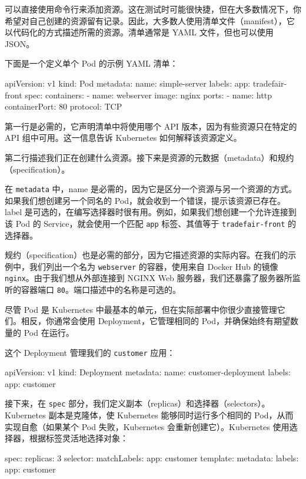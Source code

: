 \label{idx:1974}
可以直接使用命令行来添加资源。这在测试时可能很快捷，但在大多数情况下，你希望对自己创建的资源留有记录。因此，大多数人使用清单文件（manifest），它以代码化的方式描述所需的资源。清单通常是 YAML 文件，但也可以使用 JSON。

下面是一个定义单个 Pod 的示例 YAML 清单：

\begin{codebox}[yaml]
apiVersion: v1
kind: Pod
metadata:
  name: simple-server
  labels:
    app: tradefair-front
spec:
  containers:
    - name: webserver
      image: nginx
      ports:
        - name: http
          containerPort: 80
          protocol: TCP
\end{codebox}

第一行是必需的，它声明清单中将使用哪个 API 版本，因为有些资源只在特定的 API 组中可用。这一信息告诉 Kubernetes 如何解释该资源定义。

第二行描述我们正在创建什么资源。接下来是资源的元数据（metadata）和规约（specification）。

在 \texttt{metadata} 中，name 是必需的，因为它是区分一个资源与另一个资源的方式。如果我们想创建另一个同名的 Pod，就会收到一个错误，提示该资源已存在。label 是可选的，在编写选择器时很有用。例如，如果我们想创建一个允许连接到该 Pod 的 Service，就会使用一个匹配 \texttt{app} 标签、其值等于 \texttt{tradefair-front} 的选择器。

\label{idx:1975}
规约（specification）也是必需的部分，因为它描述资源的实际内容。在我们的示例中，我们列出一个名为 \texttt{webserver} 的容器，使用来自 Docker Hub 的镜像 \texttt{nginx}。由于我们想从外部连接到 NGINX Web 服务器，我们还暴露了服务器所监听的容器端口 \texttt{80}。端口描述中的名称是可选的。

尽管 Pod 是 Kubernetes 中最基本的单元，但在实际部署中你很少直接管理它们。相反，你通常会使用 Deployment，它管理相同的 Pod，并确保始终有期望数量的 Pod 在运行。

这个 Deployment 管理我们的 \texttt{customer} 应用：

\begin{codebox}[yaml]
apiVersion: v1
kind: Deployment
metadata:
  name: customer-deployment
  labels:
    app: customer
\end{codebox}

接下来，在 \texttt{spec} 部分，我们定义副本（replicas）和选择器（selectors）。Kubernetes 副本是克隆体，使 Kubernetes 能够同时运行多个相同的 Pod，从而实现自愈（如果某个 Pod 失败，Kubernetes 会重新创建它）。Kubernetes 使用选择器，根据标签灵活地选择对象：

\begin{codebox}[yaml]
spec:
  replicas: 3
  selector:
    matchLabels:
      app: customer
  template:
    metadata:
      labels:
        app: customer
\end{codebox}

